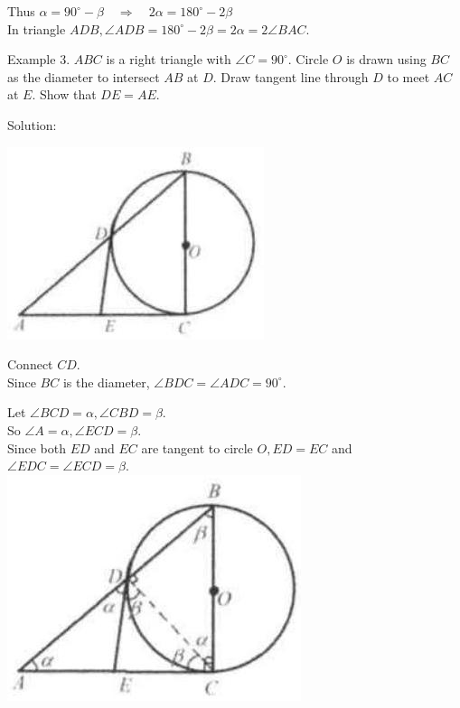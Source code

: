 \documentclass[10pt]{article}
\begin{document}
Thus \(\alpha=90^{\circ}-\beta \quad \Rightarrow \quad 2 \alpha=180^{\circ}-2 \beta\)\\
In triangle \(A D B, \angle A D B=180^{\circ}-2 \beta=2 \alpha=2 \angle B A C\).

Example 3. \(A B C\) is a right triangle with \(\angle C=90^{\circ}\). Circle \(O\) is drawn using \(B C\) as the diameter to intersect \(A B\) at \(D\). Draw tangent line through \(D\) to meet \(A C\) at \(E\). Show that \(D E=A E\).

Solution:
\begin{center}
\includegraphics[max width=\textwidth]{2025_04_17_97bc1f7e44d93c271a88g-163(3)}
\end{center}

Connect \(C D\).\\
Since \(B C\) is the diameter, \(\angle B D C=\angle A D C=90^{\circ}\).


Let \(\angle B C D=\alpha, \angle C B D=\beta\).\\
So \(\angle A=\alpha, \angle E C D=\beta\).\\
Since both \(E D\) and \(E C\) are tangent to circle \(O, E D=E C\) and \(\angle E D C=\angle E C D=\beta\).\\
\includegraphics[max width=\textwidth, center]{2025_04_17_97bc1f7e44d93c271a88g-164}
\end{document}
